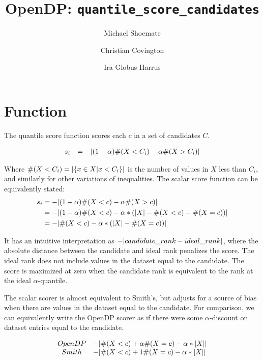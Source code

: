 

% 


\title{OpenDP: \texttt{quantile\_score\_candidates}}
\author{Michael Shoemate \and Christian Covington \and Ira Globus-Harrus}

\maketitle

\section{Function}
The quantile score function scores each $c$ in a set of candidates $C$.

\begin{equation}
\begin{array}{rl}
    s_i &= -\lvert(1 - \alpha) \#(X < C_i) - \alpha \#(X > C_i)\rvert
\end{array}
\end{equation}

Where $\#(X < C_i) = \lvert\{x \in X | x < C_i\}\rvert$ is the number of values in $X$ less than $C_i$, 
and similarly for other variations of inequalities.
The scalar score function can be equivalently stated:
\begin{align}
    s_i &= -\lvert(1 - \alpha) \#(X < c) - \alpha \#(X > c)\rvert \\
    &= -\lvert(1 - \alpha) \#(X < c) - \alpha * (\lvert X\rvert - \#(X < c) - \#(X = c))\rvert \\
    &= -\lvert\#(X < c) - \alpha * (\lvert X\rvert - \#(X = c))\rvert
\end{align}

It has an intuitive interpretation as $-\lvert candidate\_rank - ideal\_rank\rvert$, 
where the absolute distance between the candidate and ideal rank penalizes the score.
The ideal rank does not include values in the dataset equal to the candidate.
The score is maximized at zero when the candidate rank is equivalent to the rank at the ideal $\alpha$-quantile.

The scalar scorer is almost equivalent to Smith's\cite{Smith11}, but adjusts for a source of bias when there are values in the dataset equal to the candidate.
For comparison, we can equivalently write the OpenDP scorer as if there were some $\alpha$-discount on dataset entries equal to the candidate.

\[
\begin{array}{cl}
    OpenDP &-\lvert\#(X < c) + \alpha \#(X = c) - \alpha * \lvert X\rvert\rvert \\
    Smith &-\lvert\#(X < c) + 1 \#(X = c) - \alpha * \lvert X\rvert\rvert
\end{array}
\]

